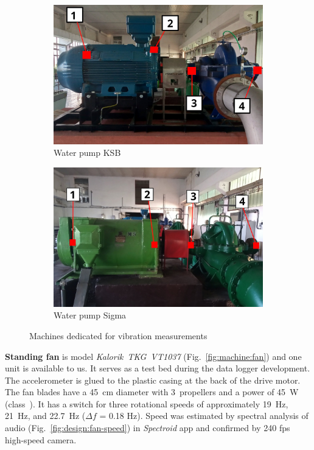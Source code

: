 \begin{figure}[h]
\begin{subfigure}[b]{0.49\textwidth}
        \includegraphics[width=\textwidth]{assets/design/sensor/ksb-pump.jpg}
        \caption{\footnotesize Water pump KSB}
        \label{fig:machine:pump-ksb}
    \end{subfigure}
    \hfill
    \begin{subfigure}[b]{0.49\textwidth}
    		\centering
        \includegraphics[width=\textwidth]{assets/design/sensor/sigma-pump.jpg}
        \caption{\footnotesize Water pump Sigma}
        \label{fig:machine:pump-sigma}
    \end{subfigure}
    \caption{Machines dedicated for vibration measurements}
    \label{fig:design:machines}
\end{figure}

\textbf{Standing fan} is model \emph{Kalorik~TKG~VT1037} (Fig.~\ref{fig:machine:fan}) and one unit is available to us. It serves as a test bed during the data logger development. The accelerometer is glued to the plastic casing at the back of the drive motor. The fan blades have a 45~cm diameter with 3~propellers and a power of 45~W (class~). It has a switch for three rotational speeds of approximately 19~Hz, 21~Hz, and 22.7~Hz ($\Delta f$ = 0.18 Hz). Speed was estimated by spectral analysis of audio (Fig.~\ref{fig:design:fan-speed}) in \emph{Spectroid} app and confirmed by 240 fps high-speed camera.

